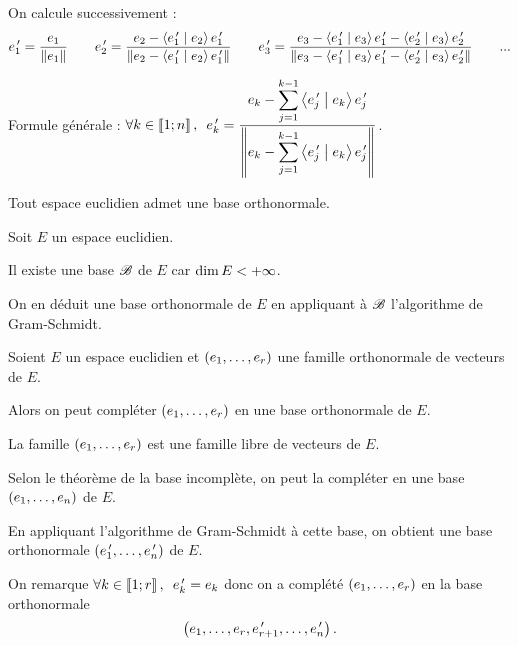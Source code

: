 \begin{dem}
On calcule successivement : \[e_1^{\,\prime}=\dfrac{e_1}{\left\|e_1\right\|}\qquad e_2^{\,\prime}=\dfrac{e_2-\left\langle e_1^{\,\prime}\;\middle|\; e_2\right\rangle e_1^{\,\prime}}{\left\|e_2-\left\langle e_1^{\,\prime}\;\middle|\; e_2\right\rangle e_1^{\,\prime}\right\|}\qquad e_3^{\,\prime}=\dfrac{e_3-\left\langle e_1^{\,\prime}\;\middle|\; e_3\right\rangle e_1^{\,\prime}-\left\langle e_2^{\,\prime}\;\middle|\; e_3\right\rangle e_2^{\,\prime}}{\left\|e_3-\left\langle e_1^{\,\prime}\;\middle|\; e_3\right\rangle e_1^{\,\prime}-\left\langle e_2^{\,\prime}\;\middle|\; e_3\right\rangle e_2^{\,\prime}\right\|}\qquad\text{...}\]

Formule générale : \(\quantifs{\forall k\in\interventierii{1}{n}}e_k\prim=\dfrac{e_k-\ds\sum_{j=1}^{k-1}\ps{e_j\prim}{e_k}e_j\prim}{\norme{e_k-\ds\sum_{j=1}^{k-1}\ps{e_j\prim}{e_k}e_j\prim}}\).
\end{dem}

\begin{cor}
Tout espace euclidien admet une base orthonormale.
\end{cor}

\begin{dem}
Soit \(E\) un espace euclidien.

Il existe une base \(\mathscr{B}\) de \(E\) car \(\dim E<+\infty\).

On en déduit une base orthonormale de \(E\) en appliquant à \(\mathscr{B}\) l'algorithme de Gram-Schmidt.
\end{dem}

\begin{theo}
Soient \(E\) un espace euclidien et \(\left(e_1,\dots,e_r\right)\) une famille orthonormale de vecteurs de \(E\).

Alors on peut compléter \(\left(e_1,\dots,e_r\right)\) en une base orthonormale de \(E\).
\end{theo}

\begin{dem}
La famille \(\left(e_1,\dots,e_r\right)\) est une famille libre de vecteurs de \(E\).

Selon le théorème de la base incomplète, on peut la compléter en une base \(\left(e_1,\dots,e_n\right)\) de \(E\).

En appliquant l'algorithme de Gram-Schmidt à cette base, on obtient une base orthonormale \(\left(e_1^{\,\prime},\dots,e_n^{\,\prime}\right)\) de \(E\).

On remarque \(\quantifs{\forall k\in\interventierii{1}{r}}e_k\prim=e_k\) donc on a complété \(\left(e_1,\dots,e_r\right)\) en la base orthonormale \[\left(e_1,\dots,e_r,e_{r+1}^{\,\prime},\dots,e_n^{\,\prime}\right).\]
\end{dem}

